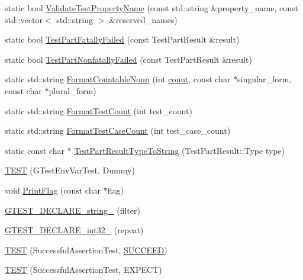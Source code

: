 \begin{DoxyCompactItemize}
\item 
static bool \mbox{\hyperlink{namespacetesting_af251394d0785f8cd18dc178d0d766b08}{Validate\+Test\+Property\+Name}} (const std\+::string \&property\+\_\+name, const std\+::vector$<$ std\+::string $>$ \&reserved\+\_\+names)
\item 
static bool \mbox{\hyperlink{namespacetesting_a9f19442d566c7eaec0702b9fcf282b63}{Test\+Part\+Fatally\+Failed}} (const Test\+Part\+Result \&result)
\item 
static bool \mbox{\hyperlink{namespacetesting_af256d104ca665115eb291f762bb659e3}{Test\+Part\+Nonfatally\+Failed}} (const Test\+Part\+Result \&result)
\item 
static std\+::string \mbox{\hyperlink{namespacetesting_a33e070c3e994cb75f9017fa2a044d536}{Format\+Countable\+Noun}} (int \mbox{\hyperlink{gmock__stress__test_8cc_afd9db40e3361ae09188795e8cbe19752}{count}}, const char $\ast$singular\+\_\+form, const char $\ast$plural\+\_\+form)
\item 
static std\+::string \mbox{\hyperlink{namespacetesting_a7420a0eb48a02ba210e265afb75febdf}{Format\+Test\+Count}} (int test\+\_\+count)
\item 
static std\+::string \mbox{\hyperlink{namespacetesting_ab8cabb45f3d8c52d336372c1b62d75c5}{Format\+Test\+Case\+Count}} (int test\+\_\+case\+\_\+count)
\item 
static const char $\ast$ \mbox{\hyperlink{namespacetesting_a4e9fdeef31f7e49afccfde0532f76864}{Test\+Part\+Result\+Type\+To\+String}} (Test\+Part\+Result\+::\+Type type)
\item 
\mbox{\hyperlink{namespacetesting_af4187d1b48a2812f1335721ed8f30a99}{T\+E\+ST}} (G\+Test\+Env\+Var\+Test, Dummy)
\item 
void \mbox{\hyperlink{namespacetesting_a9863402455bfcf9be5fc0b1453a6d97d}{Print\+Flag}} (const char $\ast$flag)
\item 
\mbox{\hyperlink{namespacetesting_a20d69860ce843142c7f740262e6b0c9a}{G\+T\+E\+S\+T\+\_\+\+D\+E\+C\+L\+A\+R\+E\+\_\+string\+\_\+}} (filter)
\item 
\mbox{\hyperlink{namespacetesting_a315ef0647e4f2795bf1705de8e9c9659}{G\+T\+E\+S\+T\+\_\+\+D\+E\+C\+L\+A\+R\+E\+\_\+int32\+\_\+}} (repeat)
\item 
\mbox{\hyperlink{namespacetesting_ae0cbea692840c88ab0b03285eb69ac97}{T\+E\+ST}} (Successful\+Assertion\+Test, \mbox{\hyperlink{gtest_8h_a75adcdf89f69b0b615e395daafc315af}{S\+U\+C\+C\+E\+ED}})
\item 
\mbox{\hyperlink{namespacetesting_af6c8f998f934372e5687d3998068e5e4}{T\+E\+ST}} (Successful\+Assertion\+Test, E\+X\+P\+E\+CT)

\end{DoxyCompactItemize}
